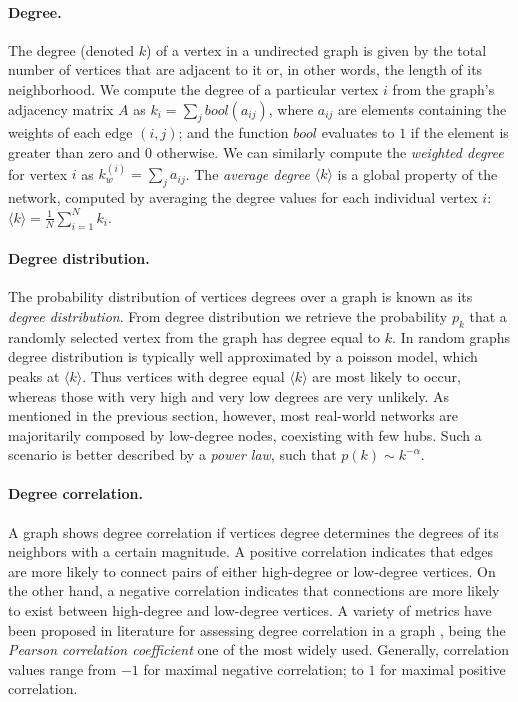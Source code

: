 \paragraph*{Degree.}
The degree (denoted $k$) of a vertex in a undirected graph is given by the total number of vertices that are adjacent to it or, in other words, the length of its neighborhood.
We compute the degree of a particular vertex $i$ from the graph's adjacency matrix $A$ as 
$
k_i = \sum_j bool(a_{i j})
$,
where $a_{i j}$ are elements containing the weights of each edge $(i,j)$; and the function $bool$ evaluates to $1$ if the element is greater than zero and $0$ otherwise.
We can similarly compute the \textit{weighted degree} for vertex $i$ as $ k_w^{(i)} = \sum_j a_{i j} $.
The \textit{average degree} 
$\langle k \rangle$ 
is a global property of the network, computed by averaging the degree values for each individual vertex $i$:
$\langle k \rangle = \frac{1}{N} \sum_{i=1}^N k_i$.

\paragraph*{Degree distribution.}
The probability distribution of vertices degrees over a graph is known as its \textit{degree distribution}.
From degree distribution we retrieve the probability $p_k$ that a randomly selected vertex from the graph has degree equal to $k$.
In random graphs degree distribution is typically well approximated by a poisson model, which peaks at $\langle k \rangle$.
Thus vertices with degree equal $\langle k \rangle$ are most likely to occur, whereas those with very high and very low degrees are very unlikely. 
As mentioned in the previous section, however, most real-world networks are majoritarily composed by low-degree nodes, coexisting with few hubs.
Such a scenario is better described by a \textit{power law}, such that $p(k) \sim k^{-\alpha}$.

\paragraph*{Degree correlation.}
A graph shows degree correlation if vertices degree determines the degrees of its neighbors with a certain magnitude.
A positive correlation indicates that edges are more likely to connect pairs of either high-degree or low-degree vertices.
On the other hand, a negative correlation indicates that connections are more likely to exist between high-degree and low-degree vertices.
A variety of metrics have been proposed in literature for assessing degree correlation in a graph \cite{Newman2003b}, being the \textit{Pearson correlation coefficient} one of the most widely used.
Generally, correlation values range from $-1$ for maximal negative correlation; to $1$ for maximal positive correlation. 

